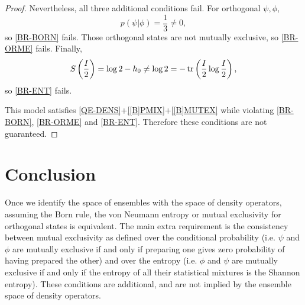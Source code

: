 \documentclass{techbrief}
\begin{document}
\begin{proof}
	Nevertheless, all three additional conditions fail.
	For orthogonal $\psi,\phi$,
	\begin{equation*}
		p(\psi|\phi)=\frac{1}{3}\neq0,
	\end{equation*}
	so \ref{BR-BORN} fails. Those orthogonal states are not
	mutually exclusive, so \ref{BR-ORME} fails. Finally,
	\begin{equation*}
		S\left(\frac{I}{2}\right)
		=\log2-h_0
		\neq\log2
		=-\operatorname{tr}\left(\frac{I}{2}\log\frac{I}{2}\right),
	\end{equation*}
	so \ref{BR-ENT} fails.
	
	This model satisfies
	\ref{QE-DENS}+\ref{[B]PMIX}+\ref{[B]MUTEX}
	while violating \ref{BR-BORN}, \ref{BR-ORME} and
	\ref{BR-ENT}. Therefore these conditions are not guaranteed.
\end{proof}

\section{Conclusion}

Once we identify the space of ensembles with the space of density operators, assuming the Born rule, the von Neumann entropy or mutual exclusivity for orthogonal states is equivalent. The main extra requirement is the consistency between mutual exclusivity as defined over the conditional probability (i.e. $\psi$ and $\phi$ are mutually exclusive if and only if preparing one gives zero probability of having prepared the other) and over the entropy (i.e. $\phi$ and $\psi$ are mutually exclusive if and only if the entropy of all their statistical mixtures is the Shannon entropy). These conditions are additional, and are not implied by the ensemble space of density operators.
	
\end{document}
